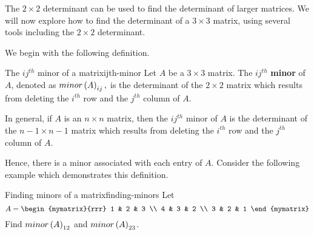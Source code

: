The $2 \times 2$ determinant can be used to find the determinant of larger matrices.
We will now explore how to find the determinant of a $3 \times 3$ matrix, using several tools
including the $2 \times 2$ determinant.

We begin with the following definition. 

\begin{definition}{The $ij^{th}$ minor of a matrix}{ijth-minor}
Let $A$ be a $3\times 3$ matrix. The $ij^{th}$ \textbf{minor} of $A$, denoted as $minor\left(A\right) _{ij},$ is the determinant
of the $2\times 2$ matrix which results from deleting the $i^{th}$ row and
the $j^{th}$ column of $A$.

In general, if $A$ is an $n\times n$ matrix, then the $ij^{th}$ minor of $A$ is the determinant of the $n-1 \times n-1$ matrix which results from deleting the $i^{th}$ row and the $j^{th}$ column of $A$. 
\end{definition}

Hence, there is a minor associated with each entry of $A$. Consider the following example which demonstrates this definition. 

\begin{example}{Finding minors of a matrix}{finding-minors}
Let 
\begin{equation*}
A = \begin{mymatrix}{rrr}
1 & 2 & 3 \\
4 & 3 & 2 \\
3 & 2 & 1
\end{mymatrix} 
\end{equation*}
Find $minor\left(A\right) _{12}$ and $minor\left(A\right) _{23}$.
\end{example}

